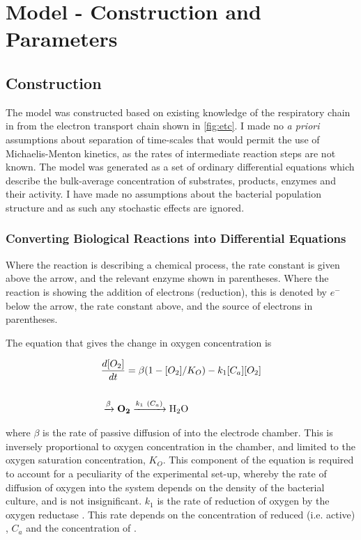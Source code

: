 \chapter{Model - Construction and Parameters}
\section{Construction}

The model was constructed based on existing knowledge of the respiratory chain in \Nsm{} from the electron transport chain shown in \ref{fig:etc}. I made no \textit{a priori} assumptions about separation of time-scales that would permit the use of Michaelis-Menton kinetics, as the rates of intermediate reaction steps are not known.
The model was generated as a set of ordinary differential equations which describe the bulk-average concentration of substrates, products, enzymes and their activity. I have made no assumptions about the bacterial population structure and as such any stochastic effects are ignored.

\subsection{Converting Biological Reactions into Differential Equations}
Where the reaction is describing a chemical process, the rate constant is given above the arrow, and the relevant enzyme shown in parentheses. Where the reaction is showing the addition of electrons (reduction), this is denoted by $e^-$ below the arrow, the rate constant above, and the source of electrons in parentheses.

The equation that gives the change in oxygen concentration is

\begin{eqnarray}
&\frac{d[O_2]}{dt} = \beta(1-[O_2]/K_O) - k_{1}[C_a][O_2] \nonumber \\\nonumber \\
&\xrightarrow{\beta} \mathbf{O_2} \xrightarrow{k_1~(C_a)} \textnormal{H$_\textnormal{2}$O}
\label{eq:oxygen}
\end{eqnarray}

where $\beta$ is the rate of passive diffusion of \cOxygen{} into the electrode chamber. This is inversely proportional to oxygen concentration in the chamber, and limited to the oxygen saturation concentration, $K_O$. This component of the equation is required to account for a peculiarity of the experimental set-up, whereby the rate of diffusion of oxygen into the system depends on the density of the bacterial culture, and is not insignificant. $k_{1}$ is the rate of reduction of oxygen by the oxygen reductase \cbbthree{}. This rate depends on the concentration of reduced (i.e. active) \cbbthree{}, $C_a$ and the concentration of \cOxygen{}.

